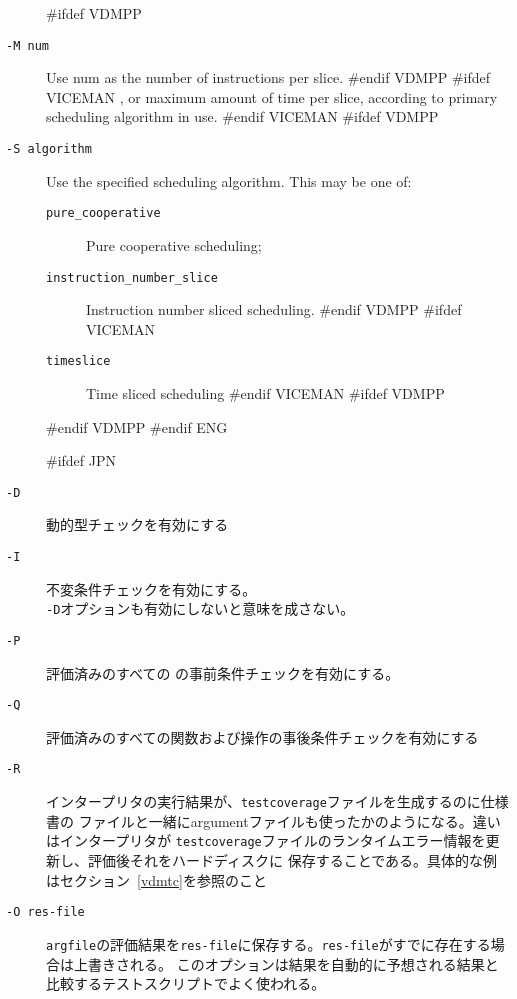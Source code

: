 \documentclass[\pformat,12pt]{article}
\begin{document}
\begin{description}
#ifdef VDMPP
\item[{\tt -M num}] Use num as the number of instructions per slice.
#endif VDMPP
#ifdef VICEMAN
, or maximum amount of time per slice, according to primary scheduling algorithm in use.
#endif VICEMAN
#ifdef VDMPP
\item[{\tt -S algorithm}] Use the specified scheduling algorithm. This
  may be one of:
  \begin{description}
  \item[{\tt pure\_cooperative}] Pure cooperative scheduling;
  \item[{\tt instruction\_number\_slice}] Instruction number sliced
    scheduling.
#endif VDMPP
#ifdef VICEMAN
  \item[{\tt timeslice}] Time sliced scheduling
#endif VICEMAN
#ifdef VDMPP
  \end{description}
#endif VDMPP
#endif ENG

#ifdef JPN
\item[{\tt -D}] 動的型チェックを有効にする
  
\item[{\tt -I}] 不変条件チェックを有効にする。 \\
  {\tt -D}オプションも有効にしないと意味を成さない。\\

\item[{\tt -P}]
評価済みのすべての
の事前条件チェックを有効にする。

\item[{\tt -Q}]
評価済みのすべての関数および操作の事後条件チェックを有効にする

\item[{\tt -R}]
  インタープリタの実行結果が、{\tt testcoverage}ファイルを生成するのに仕様書の
  ファイルと一緒にargumentファイルも使ったかのようになる。違いはインタープリタが
  {\tt testcoverage}ファイルのランタイムエラー情報を更新し、評価後それをハードディスクに
  保存することである。具体的な例はセクション~\ref{vdmtc}を参照のこと
  
\item[{\tt -O res-file}]
  {\tt argfile}の評価結果を{\tt res-file}に保存する。{\tt res-file}がすでに存在する場合は上書きされる。
  このオプションは結果を自動的に予想される結果と比較するテストスクリプトでよく使われる。
  

\end{description}
\end{document}
